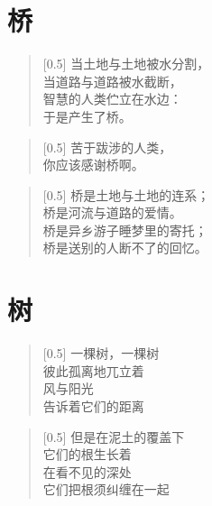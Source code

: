\documentclass[12pt,UTF-8,openany]{ctexbook}
\begin{document}
\chapter{桥}

\begin{normalsize}
    
    \begin{verse}[0.5\linewidth]
        当土地与土地被水分割， \\
        当道路与道路被水截断， \\
        智慧的人类伫立在水边： \\
        于是产生了桥。
    \end{verse}
    
    
    \begin{verse}[0.5\linewidth]
        苦于跋涉的人类， \\
        你应该感谢桥啊。
    \end{verse}
    
    
    \begin{verse}[0.5\linewidth]
        桥是土地与土地的连系； \\
        桥是河流与道路的爱情。 \\
        桥是异乡游子睡梦里的寄托； \\
        桥是送别的人断不了的回忆。
    \end{verse}
    
\end{normalsize}



\chapter{树}

\begin{normalsize}
    
    \begin{verse}[0.5\linewidth]
        一棵树，一棵树 \\
        彼此孤离地兀立着 \\
        风与阳光 \\
        告诉着它们的距离
    \end{verse}
    
    
    \begin{verse}[0.5\linewidth]
        但是在泥土的覆盖下 \\
        它们的根生长着 \\
        在看不见的深处 \\
        它们把根须纠缠在一起
    \end{verse}
    
\end{normalsize}
\end{document}

